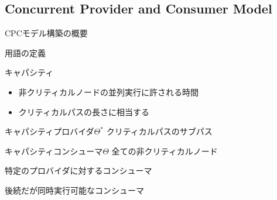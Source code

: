 \subsection{Concurrent Provider and Consumer Model}
\label{ssec: Concurrent provider and consumer model}

\begin{frame}{CPCモデル構築の概要}
\end{frame}

\begin{frame}{用語の定義}
    \begin{block}{キャパシティ}
        \setlength{\linewidth}{0.98\columnwidth}
        \begin{itemize}
            \item 非クリティカルノードの並列実行に許される時間
            \item クリティカルパスの長さに相当する
        \end{itemize}
    \end{block}
    \begin{block}{キャパシティプロバイダ$\Theta^{*}$}
        クリティカルパスのサブパス
    \end{block}
    \begin{block}{キャパシティコンシューマ$\Theta$}
        全ての非クリティカルノード
    \end{block}
\end{frame}

\begin{frame}{特定のプロバイダに対するコンシューマ}
\end{frame}

\begin{frame}{後続だが同時実行可能なコンシューマ}
\end{frame}

